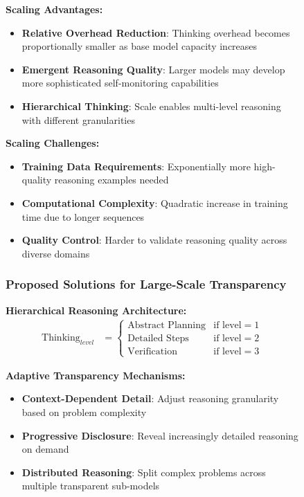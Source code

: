 \begin{figure}[H]
\begin{table}[H]
\textbf{Scaling Advantages:}
\begin{itemize}
    \item \textbf{Relative Overhead Reduction}: Thinking overhead becomes proportionally smaller as base model capacity increases
    \item \textbf{Emergent Reasoning Quality}: Larger models may develop more sophisticated self-monitoring capabilities
    \item \textbf{Hierarchical Thinking}: Scale enables multi-level reasoning with different granularities
\end{itemize}

\textbf{Scaling Challenges:}
\begin{itemize}
    \item \textbf{Training Data Requirements}: Exponentially more high-quality reasoning examples needed
    \item \textbf{Computational Complexity}: Quadratic increase in training time due to longer sequences
    \item \textbf{Quality Control}: Harder to validate reasoning quality across diverse domains
\end{itemize}

\subsubsection{Proposed Solutions for Large-Scale Transparency}

\textbf{Hierarchical Reasoning Architecture:}
\begin{align}
\text{Thinking}_{level} &= \begin{cases}
\text{Abstract Planning} & \text{if level} = 1 \\
\text{Detailed Steps} & \text{if level} = 2 \\
\text{Verification} & \text{if level} = 3
\end{cases}
\end{align}

\textbf{Adaptive Transparency Mechanisms:}
\begin{itemize}
    \item \textbf{Context-Dependent Detail}: Adjust reasoning granularity based on problem complexity
    \item \textbf{Progressive Disclosure}: Reveal increasingly detailed reasoning on demand
    \item \textbf{Distributed Reasoning}: Split complex problems across multiple transparent sub-models
\end{itemize}


\end{table}
\end{figure}
